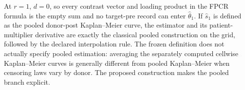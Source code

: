 At \(r=1\), \(d=0\), so every contrast vector and loading product in the FPCR formula is the empty sum and no target-pre record can enter \(\widehat\theta_1\).  If \(\widehat s_1\) is defined as the pooled donor-post Kaplan--Meier curve, the estimator and its patient-multiplier derivative are exactly the classical pooled construction on the grid, followed by the declared interpolation rule.  The frozen definition does not actually specify pooled estimation: averaging the separately computed cellwise Kaplan--Meier curves is generally different from pooled Kaplan--Meier when censoring laws vary by donor.  The proposed construction makes the pooled branch explicit.